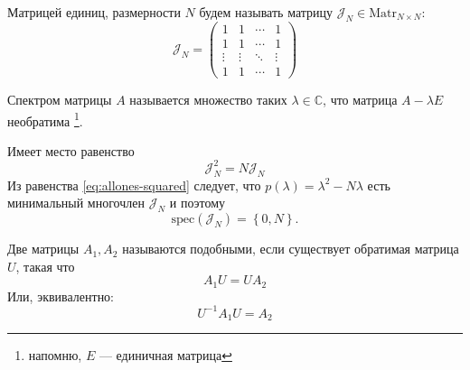 Матрицей единиц, размерности \( N \) будем называть матрицу
\( \mathscr{J}_{N} \in \mathrm{Matr}_{N\times N} \):
\[
    \mathscr{J}_{N} =
    \begin{pmatrix}
    1 & 1  & \cdots & 1 \\
    1 & 1  & \cdots & 1 \\
    \vdots & \vdots & \ddots & \vdots \\
    1 & 1  & \cdots & 1
    \end{pmatrix}
\]

Спектром матрицы \( A \) называется множество таких \( \lambda\in\mathbb{C} \),
что матрица \( {A - \lambda E} \) необратима \footnote{напомню, \( E \) --- единичная матрица}.

\begin{lemma}
    Имеет место равенство
    \begin{equation}\label{eq:allones-squared}
        \mathscr{J}_{N}^2 = N \mathscr{J}_{N}
    \end{equation}
    Из равенства \eqref{eq:allones-squared} следует, что
    \( p(\lambda) = \lambda^2-N\lambda \)
    есть минимальный многочлен \( \mathscr{J}_{N} \) и поэтому
    \[
        \mathrm{spec}\left({\mathscr{J}_{N}}\right) = \left\{ 0, N \right\}.
    \]
\end{lemma}

\begin{dfn}
    Две матрицы \( A_1, A_2 \)
    называются подобными, если существует обратимая матрица \( U \),
    такая что
    \[
        A_1 U = U A_2
        \]
    Или, эквивалентно:
    \[
        U^{-1} A_1 U = A_2
        \]
\end{dfn}

